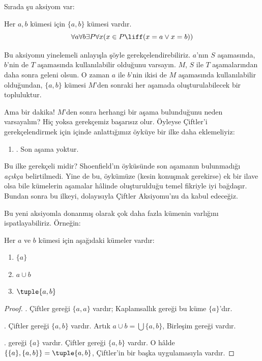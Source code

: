 


Sırada şu aksiyom var:

\begin{axiom}[Çiftler]
Her $a, b$ kümesi için $\{a, b\}$ kümesi vardır.
\[
	\forall a \forall b \exists P \forall x (x \in P \liff (x = a \lor x = b))
\]
\end{axiom}

Bu aksiyomu yinelemeli anlayışla şöyle gerekçelendirebiliriz. $a$'nın
$S$ aşamasında, $b$'nin de $T$ aşamasında kullanılabilir olduğunu
varsayın. $M$, $S$ ile $T$ aşamalarından daha sonra geleni olsun. O zaman
$a$ ile $b$'nin ikisi de $M$ aşamasında kullanılabilir olduğundan,
$\{a,b\}$ kümesi $M$'den sonraki her aşamada oluşturulabilecek bir
topluluktur.

Ama bir dakika!{} $M$'den sonra herhangi bir aşama bulunduğunu neden
varsayalım? Hiç yoksa gerekçemiz başarısız olur. Öyleyse Çiftler'i
gerekçelendirmek için  içinde anlattığımız
öyküye bir ilke daha eklemeliyiz:
\begin{enumerate}
	\item[] \stagessucc. Son aşama yoktur.
\end{enumerate}
Bu ilke gerekçeli midir? Shoenfield'ın öyküsünde son aşamanın bulunmadığı
\emph{açıkça} belirtilmedi. Yine de bu, öykümüze (kesin konuşmak gerekirse)
ek bir ilave olsa bile kümelerin aşamalar hâlinde oluşturulduğu temel
fikriyle iyi bağdaşır. Bundan sonra bu ilkeyi, dolayısıyla Çiftler
Aksiyomu'nu da kabul edeceğiz.

Bu yeni aksiyomla donanmış olarak çok daha fazla kümenin varlığını
ispatlayabiliriz. Örneğin:

\begin{prop}
Her $a$ ve $b$ kümesi için aşağıdaki kümeler vardır:
	\begin{enumerate}
		\item{} $\{a\}$
		\item{} $a \cup b$
		\item{} $\tuple{a, b}$
	\end{enumerate}
\end{prop}

\begin{proof}
. Çiftler gereği $\{a, a\}$ vardır; Kaplamsallık gereği
bu küme $\{a\}$'dır.

. Çiftler gereği $\{a, b\}$ vardır. Artık
$a \cup b = \bigcup\{a, b\}$, Birleşim gereği vardır.

.  gereği $\{a\}$ vardır. Çiftler gereği
$\{a,b\}$ vardır. O hâlde $\{\{a\}, \{a,b\}\} = \tuple{a,b}$, Çiftler'in
bir başka uygulamasıyla vardır.
\end{proof}

